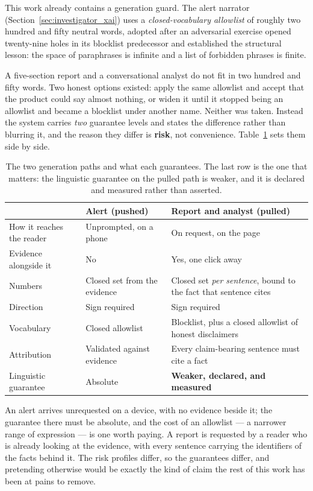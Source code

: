 This work already contains a generation guard. The alert narrator
(Section~\ref{sec:investigator_xai}) uses a \emph{closed-vocabulary allowlist} of roughly
two hundred and fifty neutral words, adopted after an adversarial exercise opened twenty-nine holes
in its blocklist predecessor and established the structural lesson: the space of paraphrases is
infinite and a list of forbidden phrases is finite.

A five-section report and a conversational analyst do not fit in two hundred and fifty words. Two
honest options existed: apply the same allowlist and accept that the product could say almost
nothing, or widen it until it stopped being an allowlist and became a blocklist under another name.
Neither was taken. Instead the system carries \emph{two} guarantee levels and states the difference
rather than blurring it, and the reason they differ is \textbf{risk}, not convenience.
Table~\ref{tab:two_guards} sets them side by side.

\begin{table}[ht]
\centering
\caption[Two levels of generation guarantee]{The two generation paths and what each guarantees. The
last row is the one that matters: the linguistic guarantee on the pulled path is weaker, and it is
declared and measured rather than asserted.}
\label{tab:two_guards}
\begin{tabular}{p{}p{}p{}}
\toprule
& Alert (pushed) & Report and analyst (pulled) \\
\midrule
How it reaches the reader & Unprompted, on a phone & On request, on the page \\
Evidence alongside it & No & Yes, one click away \\
Numbers & Closed set from the evidence & Closed set \emph{per sentence}, bound to the fact that
sentence cites \\
Direction & Sign required & Sign required \\
Vocabulary & Closed allowlist & Blocklist, plus a closed allowlist of honest disclaimers \\
Attribution & Validated against evidence & Every claim-bearing sentence must cite a fact \\
Linguistic guarantee & Absolute & \textbf{Weaker, declared, and measured} \\
\bottomrule
\end{tabular}
\end{table}

An alert arrives unrequested on a device, with no evidence beside it; the guarantee there must be
absolute, and the cost of an allowlist --- a narrower range of expression --- is one worth paying. A
report is requested by a reader who is already looking at the evidence, with every sentence carrying
the identifiers of the facts behind it. The risk profiles differ, so the guarantees differ, and
pretending otherwise would be exactly the kind of claim the rest of this work has been at pains to
remove.

